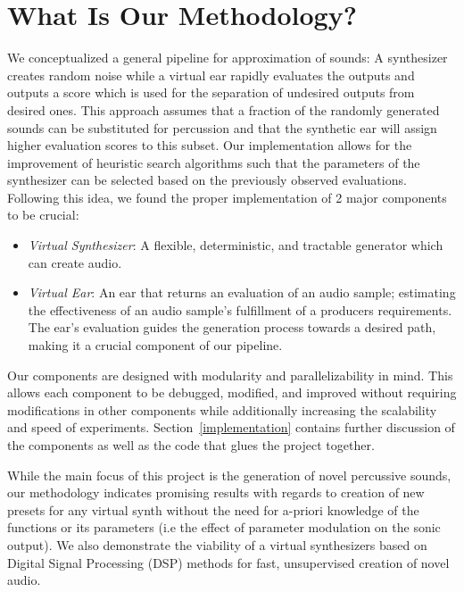 \documentclass[\main/thesis.tex]{subfiles}
\begin{document}
\section{What Is Our Methodology?}
\label{sec_methodology}
We conceptualized a general pipeline for approximation of sounds: A synthesizer creates random noise while a virtual ear rapidly evaluates the outputs and outputs a score which is used for the separation of undesired outputs from desired ones. This approach assumes that a fraction of the randomly generated sounds can be substituted for percussion and that the synthetic ear will assign higher evaluation scores to this subset. Our implementation allows for the improvement of heuristic search algorithms such that the parameters of the synthesizer can be selected based on the previously observed evaluations. Following this idea, we found the proper implementation of 2 major components to be crucial:

\begin{itemize}
    \item \textit{Virtual Synthesizer}: A flexible, deter\-min\-istic, and tract\-able gener\-ator which can create audio. 
    \item \textit{Virtual Ear}: An ear that returns an evaluation of an audio sample; estimating the effectiveness of an audio sample's fulfillment of a producers requirements. The ear's evaluation guides the generation process towards a desired path, making it a crucial component of our pipeline. 
\end{itemize}

Our components are designed with modularity and parallelizability in mind. This allows each component to be debugged, modified, and improved without requiring modifications in other components while additionally increasing the scalability and speed of experiments. 
Section~\ref{implementation} contains further discussion of the components as well as the code that glues the project together.

While the main focus of this project is the generation of novel percussive sounds, our methodology indicates promising results with regards to creation of new presets for any virtual synth without the need for a-priori knowledge of the functions or its parameters (i.e the effect of parameter modulation on the sonic output). We also demonstrate the viability of a virtual synthesizers based on Digital Signal Processing (DSP) methods for fast, unsupervised creation of novel audio. 


\end{document}
